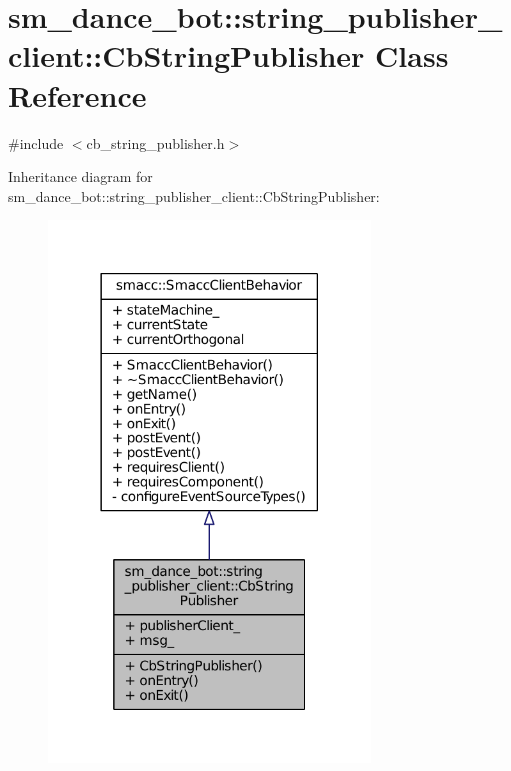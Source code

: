 \hypertarget{classsm__dance__bot_1_1string__publisher__client_1_1CbStringPublisher}{}\section{sm\+\_\+dance\+\_\+bot\+:\+:string\+\_\+publisher\+\_\+client\+:\+:Cb\+String\+Publisher Class Reference}
\label{classsm__dance__bot_1_1string__publisher__client_1_1CbStringPublisher}


{\ttfamily \#include $<$cb\+\_\+string\+\_\+publisher.\+h$>$}



Inheritance diagram for sm\+\_\+dance\+\_\+bot\+:\+:string\+\_\+publisher\+\_\+client\+:\+:Cb\+String\+Publisher\+:
\nopagebreak
\begin{figure}[H]
\begin{center}
\leavevmode
\includegraphics[width=242pt]{classsm__dance__bot_1_1string__publisher__client_1_1CbStringPublisher__inherit__graph}
\end{center}
\end{figure}


